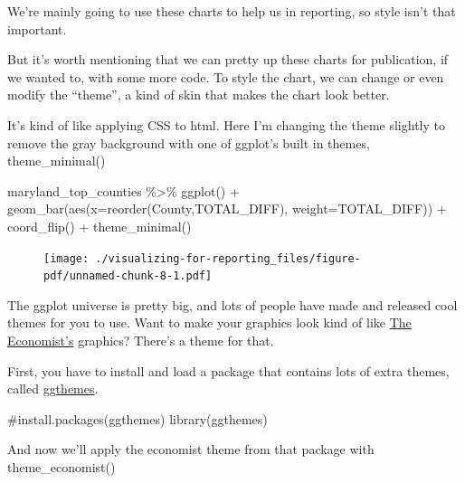 \documentclass[
  letterpaper,
  DIV=11,
  numbers=noendperiod]{scrreprt}
\newenvironment{Shaded}{\begin{snugshade}}{\end{snugshade}}
\newcommand{\AttributeTok}[1]{\textcolor[rgb]{0.40,0.45,0.13}{#1}}
\newcommand{\CommentTok}[1]{\textcolor[rgb]{0.37,0.37,0.37}{#1}}
\newcommand{\FunctionTok}[1]{\textcolor[rgb]{0.28,0.35,0.67}{#1}}
\newcommand{\NormalTok}[1]{\textcolor[rgb]{0.00,0.23,0.31}{#1}}
\newcommand{\SpecialCharTok}[1]{\textcolor[rgb]{0.37,0.37,0.37}{#1}}
\begin{document}
We're mainly going to use these charts to help us in reporting, so style
isn't that important.

But it's worth mentioning that we can pretty up these charts for
publication, if we wanted to, with some more code. To style the chart,
we can change or even modify the ``theme'', a kind of skin that makes
the chart look better.

It's kind of like applying CSS to html. Here I'm changing the theme
slightly to remove the gray background with one of ggplot's built in
themes, theme\_minimal()

\begin{Shaded}
\begin{Highlighting}[]
\NormalTok{maryland\_top\_counties }\SpecialCharTok{\%\textgreater{}\%}
  \FunctionTok{ggplot}\NormalTok{() }\SpecialCharTok{+}
  \FunctionTok{geom\_bar}\NormalTok{(}\FunctionTok{aes}\NormalTok{(}\AttributeTok{x=}\FunctionTok{reorder}\NormalTok{(County,TOTAL\_DIFF), }\AttributeTok{weight=}\NormalTok{TOTAL\_DIFF)) }\SpecialCharTok{+}
  \FunctionTok{coord\_flip}\NormalTok{() }\SpecialCharTok{+} 
  \FunctionTok{theme\_minimal}\NormalTok{()}
\end{Highlighting}
\end{Shaded}

\begin{figure}[H]

{\centering \texttt{[image: ./visualizing-for-reporting\_files/figure-pdf/unnamed-chunk-8-1.pdf]}

}

\end{figure}

The ggplot universe is pretty big, and lots of people have made and
released cool themes for you to use. Want to make your graphics look
kind of like \href{https://www.economist.com/}{The Economist's}
graphics? There's a theme for that.

First, you have to install and load a package that contains lots of
extra themes, called
\href{https://yutannihilation.github.io/allYourFigureAreBelongToUs/ggthemes/}{ggthemes}.

\begin{Shaded}
\begin{Highlighting}[]
\CommentTok{\#install.packages(\textquotesingle{}ggthemes\textquotesingle{})}
\FunctionTok{library}\NormalTok{(ggthemes)}
\end{Highlighting}
\end{Shaded}

And now we'll apply the economist theme from that package with
theme\_economist()
\end{document}
